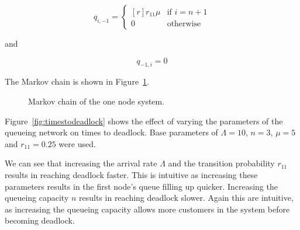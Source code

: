 \documentclass{article}
\begin{document}
\begin{equation}
  q_{i, -1} = \left\{
  \begin{matrix*}[ r ]
    r_{11}\mu & \text{if } i = n + 1 \\
    0 & \text{otherwise}
  \end{matrix*}
  \right.
\end{equation}

and

\begin{equation}
  q_{-1, i} = 0
\end{equation}

The Markov chain is shown in Figure~\ref{fig:1nodeMC}.

\begin{figure}[H]
    
    \caption{Markov chain of the one node system.}
    \label{fig:1nodeMC}
\end{figure}

Figure~\ref{fig:timestodeadlock} shows the effect of varying the parameters of the queueing network on times to deadlock.
Base parameters of $\Lambda = 10$, $n = 3$, $\mu = 5$ and $r_{11} = 0.25$ were used.

We can see that increasing the arrival rate $\Lambda$ and the transition probability $r_{11}$ results in reaching deadlock faster.
This is intuitive as increasing these parameters results in the first node's queue filling up quicker.
Increasing the queueing capacity $n$ results in reaching deadlock slower.
Again this are intuitive, as increasing the queueing capacity allows more customers in the system before becoming deadlock.
\end{document}
